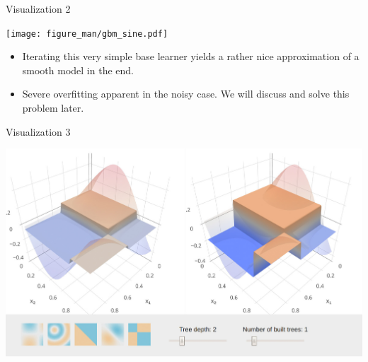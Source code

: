 
\begin{vbframe}{Visualization 2}

\vspace{-0.6cm}
\begin{center}
\texttt{[image: figure\_man/gbm\_sine.pdf]}
\end{center}

\vspace{-0.8cm}
\footnotesize
\begin{itemize}

  \item
    Iterating this very simple base learner yields a rather nice approximation of a smooth model in the end.

  \item
    Severe overfitting apparent in the noisy case. We will discuss and solve this problem later.

\end{itemize}

\end{vbframe}


\begin{vbframe}{Visualization 3}

\begin{center}
\includegraphics[width=\textwidth]{figure_man/gbm_anim/gbm1.jpg}
\href{http://arogozhnikov.github.io/2016/06/24/gradient_boosting_explained.html}{}
\end{center}
\end{vbframe}


